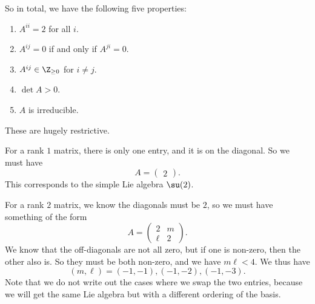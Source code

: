 \documentclass[a4paper]{article}
\begin{document}
So in total, we have the following five properties:
\begin{prop}\leavevmode
  \begin{enumerate}
    \item $A^{ii} = 2$ for all $i$.
    \item $A^{ij} = 0$ if and only if $A^{ji} = 0$.
    \item $A^{ij} \in \Z_{\geq 0}$ for $i \not= j$.
    \item $\det A > 0$.
    \item $A$ is irreducible.
  \end{enumerate}
\end{prop}

These are hugely restrictive.
\begin{eg}
  For a rank $1$ matrix, there is only one entry, and it is on the diagonal. So we must have
  \[
    A =
    \begin{pmatrix}
      2
    \end{pmatrix}.
  \]
  This corresponds to the simple Lie algebra $\su(2)$.
\end{eg}

\begin{eg}
  For a rank $2$ matrix, we know the diagonals must be $2$, so we must have something of the form
  \[
    A =
    \begin{pmatrix}
      2 & m\\
      \ell & 2
    \end{pmatrix}.
  \]
  We know that the off-diagonals are not all zero, but if one is non-zero, then the other also is. So they must be both non-zero, and we have $m\ell < 4$. We thus have
  \[
    (m, \ell) = (-1, -1), (-1, -2), (-1, -3).
  \]
  Note that we do not write out the cases where we swap the two entries, because we will get the same Lie algebra but with a different ordering of the basis.
\end{eg}
\end{document}
